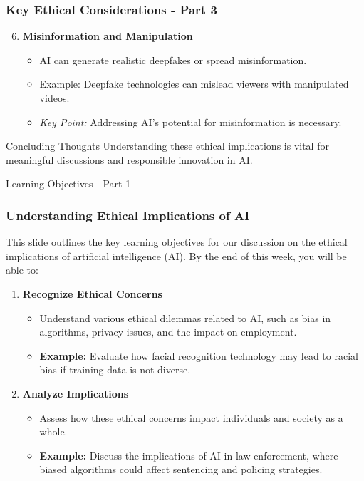 \documentclass[aspectratio=169]{beamer}
\begin{document}
\begin{frame}[fragile]
    \frametitle{Key Ethical Considerations - Part 3}
    \begin{enumerate}
        \setcounter{enumi}{5} %
        \item \textbf{Misinformation and Manipulation}
        \begin{itemize}
            \item AI can generate realistic deepfakes or spread misinformation.
            \item Example: Deepfake technologies can mislead viewers with manipulated videos.
            \item \textit{Key Point:} Addressing AI's potential for misinformation is necessary.
        \end{itemize}
    \end{enumerate}

    \begin{block}{Concluding Thoughts}
        Understanding these ethical implications is vital for meaningful discussions and responsible innovation in AI.
    \end{block}
\end{frame}

\begin{frame}[fragile]{Learning Objectives - Part 1}
    \frametitle{Understanding Ethical Implications of AI}
    This slide outlines the key learning objectives for our discussion on the ethical implications of artificial intelligence (AI). By the end of this week, you will be able to:
    \begin{enumerate}
        \item \textbf{Recognize Ethical Concerns}
        \begin{itemize}
            \item Understand various ethical dilemmas related to AI, such as bias in algorithms, privacy issues, and the impact on employment.
            \item \textbf{Example:} Evaluate how facial recognition technology may lead to racial bias if training data is not diverse.
        \end{itemize}
        
        \item \textbf{Analyze Implications}
        \begin{itemize}
            \item Assess how these ethical concerns impact individuals and society as a whole. 
            \item \textbf{Example:} Discuss the implications of AI in law enforcement, where biased algorithms could affect sentencing and policing strategies.
        \end{itemize}
    \end{enumerate}
\end{frame}
\end{document}
